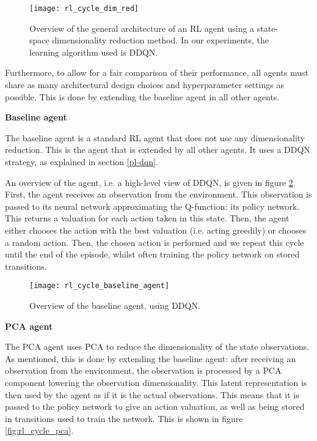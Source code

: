 \begin{figure}[h]
    \centering
    \texttt{[image: rl\_cycle\_dim\_red]}
    \caption{Overview of the general architecture of an RL agent using a state-space dimensionality reduction method. In our experiments, the learning algorithm used is DDQN.}
    \label{fig:rl_cycle_dim}
\end{figure}

Furthermore, to allow for a fair comparison of their performance, all agents must share as many architectural design choices and hyperparameter settings as possible. This is done by extending the baseline agent in all other agents. \par

\noindent \textbf{Baseline agent}\par
\noindent The baseline agent is a standard RL agent that does not use any dimensionality reduction. This is the agent that is extended by all other agents. It uses a DDQN strategy, as explained in section \ref{pl-dqn}. 

An overview of the agent, i.e. a high-level view of DDQN, is given in figure \ref{fig:rl_cycle_base}. First, the agent receives an observation from the environment. This observation is passed to its neural network approximating the Q-function: its policy network. This returns a valuation for each action taken in this state. Then, the agent either chooses the action with the best valuation (i.e. acting greedily) or chooses a random action. Then, the chosen action is performed and we repeat this cycle until the end of the episode, whilst often training the policy network on stored transitions. \par

\begin{figure}[h]
    \centering
    \texttt{[image: rl\_cycle\_baseline\_agent]}
    \caption{Overview of the baseline agent, using DDQN.}
    \label{fig:rl_cycle_base}
\end{figure}

\noindent \textbf{PCA agent}\par
\noindent The PCA agent uses PCA to reduce the dimensionality of the state observations. As mentioned, this is done by extending the baseline agent: after receiving an observation from the environment, the observation is processed by a PCA component lowering the observation dimensionality. This latent representation is then used by the agent as if it is the actual observations. This means that it is passed to the policy network to give an action valuation, as well as being stored in transitions used to train the network. This is shown in figure \ref{fig:rl_cycle_pca}.

